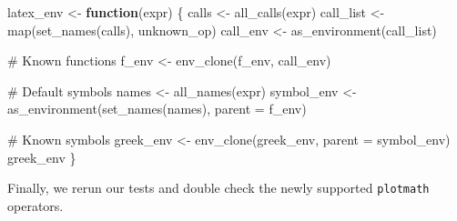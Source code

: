\documentclass[
]{krantz}
\makeatletter
\newenvironment{Shaded}{\begin{snugshade}}{\end{snugshade}}
\newcommand{\CommentTok}[1]{\textcolor[rgb]{0.56,0.35,0.01}{\textit{#1}}}
\newcommand{\ControlFlowTok}[1]{\textcolor[rgb]{0.13,0.29,0.53}{\textbf{#1}}}
\newcommand{\DataTypeTok}[1]{\textcolor[rgb]{0.13,0.29,0.53}{#1}}
\newcommand{\DecValTok}[1]{\textcolor[rgb]{0.00,0.00,0.81}{#1}}
\newcommand{\KeywordTok}[1]{\textcolor[rgb]{0.13,0.29,0.53}{\textbf{#1}}}
\newcommand{\NormalTok}[1]{#1}
\newcommand{\OperatorTok}[1]{\textcolor[rgb]{0.81,0.36,0.00}{\textbf{#1}}}
\newcommand{\StringTok}[1]{\textcolor[rgb]{0.31,0.60,0.02}{#1}}
\newenvironment{kframe}{%
\medskip{}
\setlength{\fboxsep}{.8em}
 \def\at@end@of@kframe{}%
 \ifinner\ifhmode%
  \def\at@end@of@kframe{\end{minipage}}%
  \begin{minipage}{\columnwidth}%
 \fi\fi%
 \def\FrameCommand##1{\hskip\@totalleftmargin \hskip-\fboxsep
 \colorbox{shadecolor}{##1}\hskip-\fboxsep
     \hskip-\linewidth \hskip-\@totalleftmargin \hskip\columnwidth}%
 \MakeFramed {\advance\hsize-\width
   \@totalleftmargin\z@ \linewidth\hsize
   \@setminipage}}%
 {\par\unskip\endMakeFramed%
 \at@end@of@kframe}
\renewenvironment{Shaded}{\begin{kframe}}{\end{kframe}}
\renewcommand{\KeywordTok} [1]{\textcolor[rgb]{0.00,0.44,0.13}{{#1}}}
\renewcommand{\DataTypeTok}[1]{\textcolor[rgb]{0.56,0.13,0.00}{{#1}}}
\renewcommand{\DecValTok}  [1]{\textcolor[rgb]{0.25,0.63,0.44}{{#1}}}
\renewcommand{\StringTok}  [1]{\textcolor[rgb]{0.25,0.44,0.63}{{#1}}}
\renewcommand{\CommentTok} [1]{\textcolor[rgb]{0.38,0.63,0.69}{{#1}}}
\renewcommand{\NormalTok}  [1]{{#1}}
\makeatother
\begin{document}
\begin{Shaded}
\begin{Highlighting}[]
\NormalTok{latex_env <-}\StringTok{ }\ControlFlowTok{function}\NormalTok{(expr) \{}
\NormalTok{  calls <-}\StringTok{ }\KeywordTok{all_calls}\NormalTok{(expr)}
\NormalTok{  call_list <-}\StringTok{ }\KeywordTok{map}\NormalTok{(}\KeywordTok{set_names}\NormalTok{(calls), unknown_op)}
\NormalTok{  call_env <-}\StringTok{ }\KeywordTok{as_environment}\NormalTok{(call_list)}
  
  \CommentTok{# Known functions}
\NormalTok{  f_env <-}\StringTok{ }\KeywordTok{env_clone}\NormalTok{(f_env, call_env)}
  
  \CommentTok{# Default symbols}
\NormalTok{  names <-}\StringTok{ }\KeywordTok{all_names}\NormalTok{(expr)}
\NormalTok{  symbol_env <-}\StringTok{ }\KeywordTok{as_environment}\NormalTok{(}\KeywordTok{set_names}\NormalTok{(names), }\DataTypeTok{parent =}\NormalTok{ f_env)}
  
  \CommentTok{# Known symbols}
\NormalTok{  greek_env <-}\StringTok{ }\KeywordTok{env_clone}\NormalTok{(greek_env, }\DataTypeTok{parent =}\NormalTok{ symbol_env)}
\NormalTok{  greek_env}
\NormalTok{\}}
\end{Highlighting}
\end{Shaded}

Finally, we rerun our tests and double check the newly supported \texttt{plotmath} operators.

\begin{Shaded}
\end{Shaded}
\end{document}
